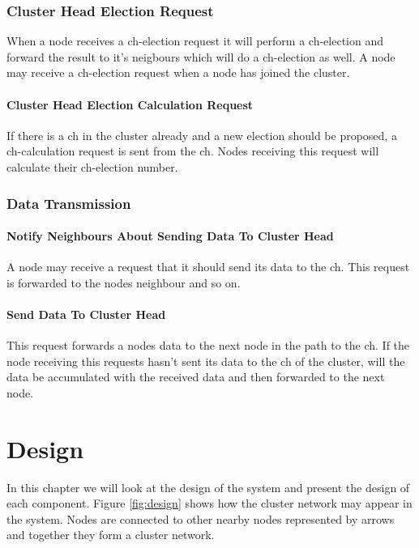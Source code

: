 \documentclass[USenglish]{uit-thesis}
\begin{document}
\subsection{Cluster Head Election Request}
When a node receives a \gls{ch}-election request it will perform a \gls{ch}-election and forward the result to it's neigbours which will do a \gls{ch}-election as well.
A node may receive a \gls{ch}-election request when a node has joined the cluster.

\subsubsection{Cluster Head Election Calculation Request}
If there is a \gls{ch} in the cluster already and a new election should be proposed, a \gls{ch}-calculation request is sent from the \gls{ch}. Nodes receiving this request will calculate their \gls{ch}-election number. %

\subsection{Data Transmission}
\subsubsection{Notify Neighbours About Sending Data To Cluster Head}
A node may receive a request that it should send its data to the \gls{ch}. This request is forwarded to the nodes neighbour and so on.

\subsubsection{Send Data To Cluster Head}
This request forwards a nodes data to the next node in the path to the \gls{ch}. If the node receiving this requests hasn't sent its data to the \gls{ch} of the cluster, will the data be accumulated with the received data and then forwarded to the next node.



\chapter{Design}
\glsresetall
In this chapter we will look at the design of the system and present the design of each component. Figure \ref{fig:design} shows how the cluster network may appear in the system. Nodes are connected to other nearby nodes represented by arrows and together they form a cluster network.
\end{document}
